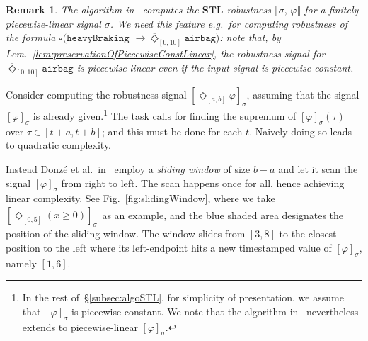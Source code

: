 \documentclass[envcountsect,orivec]{llncs} \usepackage{etex} \usepackage[]{graphicx}
\newtheorem{myremark}[mytheorem]{Remark}
\newcommand{\STL}{\textbf{STL}}
\newcommand{\DiaOp}[1]{\Diamond_{#1}}
\newcommand{\BoxOp}[1]{\square_{#1}}
\newcommand{\TDiaOp}[1]{\overline{\Diamond}_{#1}}
\newcommand{\Robust}[2]{{ \llbracket #1,\, #2 \rrbracket}}
\begin{document}
\begin{myremark}\label{rem:DonzeAlgoForPiecewiseLinear}
  The algorithm in~\cite{DBLP:conf/cav/DonzeFM13} computes the $\STL$
  robustness $\Robust{\sigma}{\varphi}$ for a finitely piecewise-\emph{linear}
  signal $\sigma$. 
  We need this feature e.g.\ for computing robustness of the formula
  \begin{math}
    \BoxOp{} (
    \mathtt{heavyBraking} 
  \end{math}
  \begin{math}
    \to \TDiaOp{[0,10]}\mathtt{airbag} )
  \end{math}: note that, by
  Lem.~\ref{lem:preservationOfPiecewiseConstLinear}, the robustness signal
  for
  $\TDiaOp{[0,10]}\mathtt{airbag} $ is piecewise-linear even if the input
  signal is piecewise-constant.
\end{myremark}





Consider  computing the robustness 
signal $[\DiaOp{[a,b]} \varphi]_{\sigma}$, assuming that the signal
$[\varphi]_{\sigma}$ is already given.\footnote{In the rest of~\S{}\ref{subsec:algoSTL}, for simplicity of
presentation, we assume that $[\varphi]_{\sigma}$ is
piecewise-constant. We note that the algorithm
in~\cite{DBLP:conf/cav/DonzeFM13} 
nevertheless extends to
piecewise-linear $[\varphi]_{\sigma}$.} The task calls for finding the supremum of
$[\varphi]_{\sigma}(\tau)$ over $\tau \in [t+a, t+b]$; and this must be done for each $t$. Naively doing so leads to quadratic complexity. 

Instead Donz\'e et al.\ in~\cite{DBLP:conf/cav/DonzeFM13} employ a
\emph{sliding window} of size $b-a$ and let it scan the signal
$[\varphi]_{\sigma}$ from right to left. The scan happens once for all,
hence achieving linear complexity. See Fig.~\ref{fig:slidingWindow},
where we take 
$[\DiaOp{[0,5]} (x\ge 0)]^+_{\sigma}$ 
as an example, 
and the blue shaded area designates the position of the sliding window.
The window slides from $[3,8]$ to the closest position to the left where
its left-endpoint hits a new timestamped value of $[\varphi]_{\sigma}$, 
namely $[1,6]$. 
\end{document}
